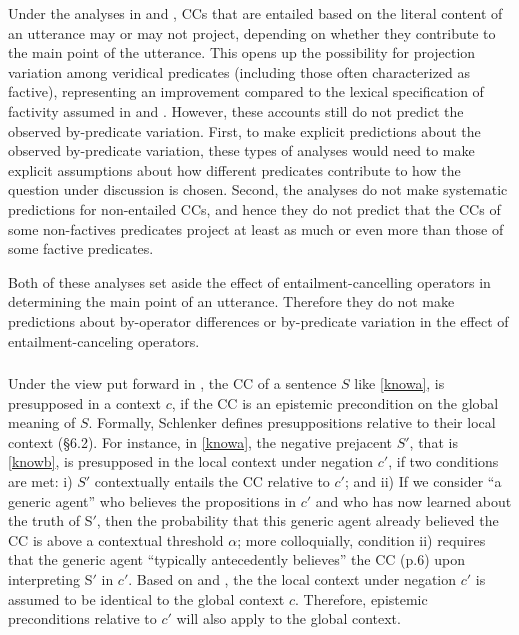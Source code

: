 \documentclass[a4paper,12pt,twoside]{article}
\begin{document}
    Under the analyses in \citealt{abrusan_predicting_2011} and \citealt{simons_best_2017}, CCs that are entailed based on the literal content of an utterance may or may not project, depending on whether they contribute to the main point of the utterance. This opens up the possibility for projection variation among veridical predicates (including those often characterized as factive), representing an improvement compared to the lexical specification of factivity assumed in \citealt{heim_projection_1983} and \citealt{van_der_sandt_presupposition_1992}. However, these accounts still do not predict the observed by-predicate variation.
    First, to make explicit predictions about the observed by-predicate variation, these types of analyses would need to make explicit assumptions about how different predicates contribute to how the question under discussion is chosen.
    Second, the analyses do not make systematic predictions for non-entailed CCs, and hence they do not predict that the CCs of some non-factives predicates project at least as much or even more than those of some factive predicates.

    Both of these analyses set aside the effect of entailment-cancelling operators in determining the main point of an utterance. Therefore they do not make predictions about by-operator differences or by-predicate variation in the effect of entailment-canceling operators.


\subsubsection{\citealt{schlenker_triggering_2021}}

    Under the view put forward in \citealt{schlenker_triggering_2021}, the CC of a sentence $S$ like \ref{knowa}, is presupposed in a context $c$, if the CC is an epistemic precondition on the global meaning of $S$. Formally, Schlenker defines presuppositions relative to their local context (\S6.2). For instance, in \ref{knowa}, the negative prejacent $S'$, that is \ref{knowb}, is presupposed in the local context under negation $c'$, if two conditions are met:
	i) $S'$ contextually entails the CC relative to $c'$;
	and ii) If we consider ``a generic agent'' who believes the propositions in $c'$ and who has now learned about the truth of S$'$, then the probability that this generic agent already believed the CC is above a contextual threshold $\alpha$;
	more colloquially, condition ii) requires that the generic agent ``typically antecedently believes'' the CC (p.6) upon interpreting S$'$ in $c'$. Based on \citealt{heim_projection_1983} and \citealt{schlenker_local_2009}, the the local context under negation $c'$ is assumed to be identical to the global context $c$. Therefore, epistemic preconditions relative to $c'$ will also apply to the global context.
\end{document}
